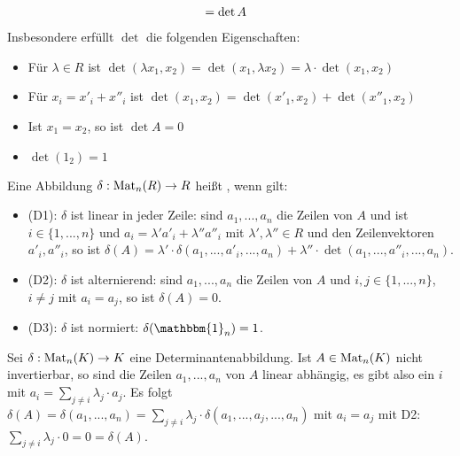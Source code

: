 \begin{remark}
\begin{align}
	&= \det A \notag
	\end{align}
	Insbesondere erfüllt $\det$ die folgenden Eigenschaften: 
	\begin{itemize}
		\item Für $\lambda\in R$ ist $\det(\lambda x_1,x_2)=\det(x_1,\lambda x_2)=\lambda\cdot \det(x_1,x_2)$
		\item Für $x_i=x'_i+x''_i$ ist $\det(x_1,x_2)=\det(x'_1,x_2) + \det(x''_1,x_2)$
		\item Ist $x_1=x_2$, so ist $\det A=0$
		\item $\det(1_2)=1$
	\end{itemize}
\end{remark}

\begin{definition}[Determinantenabbildung]
	Eine Abbildung $\delta:\operatorname{Mat}_n(R)\to R$ heißt , wenn gilt:
	\begin{itemize}
		\item (D1): $\delta$ ist linear in jeder Zeile: sind $a_1,...,a_n$ die Zeilen von $A$ und ist $i\in \{1,...,n\}$ und $a_i=\lambda'a'_i + 
		\lambda''a''_i$ mit $\lambda',\lambda''\in R$ und den Zeilenvektoren $a'_i,a''_i$, so ist $\delta(A)=\lambda'\cdot \delta(a_1,...,
		a'_i,...,a_n) + \lambda''\cdot \det(a_1,...,a''_i,...,a_n)$.
		\item (D2): $\delta$ ist alternierend: sind $a_1,...,a_n$ die Zeilen von $A$ und $i,j\in \{1,...,n\}$, $i\neq j$ mit $a_i=a_j$, so ist 
		$\delta(A)=0$.
		\item (D3): $\delta$ ist normiert: $\delta(\mathbbm{1}_n)=1$.
	\end{itemize}
\end{definition}

\begin{example}
	Sei $\delta:\operatorname{Mat}_n(K)\to K$ eine Determinantenabbildung. Ist $A\in \operatorname{Mat}_n(K)$ nicht invertierbar, so sind die Zeilen 
	$a_1,...,a_n$ von $A$ linear abhängig, es gibt also ein $i$ mit $a_i=\sum_{j\neq i} \lambda_j\cdot a_j$. Es folgt $\delta(A)=
	\delta(a_1,...,a_n)=\sum_{j\neq i} \lambda_j\cdot \delta(a_1,...,a_j,...,a_n)$ mit $a_i=a_j$ mit D2: $\sum_{j\neq i} 
	\lambda_j\cdot 0=0=\delta(A)$.
\end{example}

